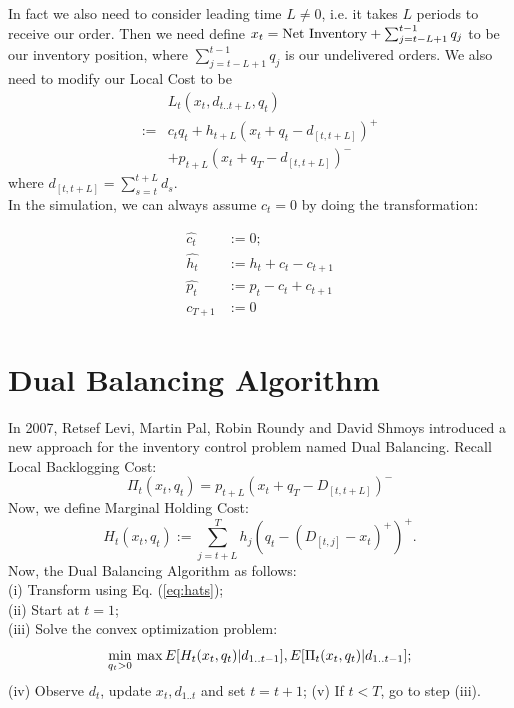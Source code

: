 \documentclass[twoside]{article}
\begin{document}
\begin{multicols}{2}
    In fact we also need to consider leading time $L \neq 0$, i.e. it takes $L$ periods to receive our order. Then we need define $x_t={\rm Net~Inventory}  + \sum_{j = t - L+1}^{t-1} q_j$ to be our inventory position, where $\sum_{j = t - L+1}^{t-1} q_j$ is our undelivered orders. We also need to modify our Local Cost to be 
        \begin{equation}\label{eq:Lneq0}
        \begin{array}{rl}
              & L_t(x_t,d_{t..t+L},q_t)\\
          := &c_tq_t + h_{t+L}(x_t + q_t - d_{[t,t+L]})^{+}\\
                                &  + p_{t+L}(x_t + q_T - d_{[t,t+L]})^{-}
        \end{array}
        \end{equation}
        where $d_{[t,t+L]}=\sum_{s=t}^{t+L} d_s$.\\
        In the simulation, we can always assume $c_t = 0$ by doing the transformation:
        
        \begin{equation}\label{eq:hats}
        \begin{array}{rl}
          \hat{c_t} &:= 0;\nonumber\\
          \hat{h_t} &:= h_t + c_t - c_{t+1}\nonumber\\
          \hat{p_t} &:= p_t - c_t + c_{t+1}\nonumber\\
          c_{T+1} &:= 0\nonumber
        \end{array}
        \end{equation}

\section{Dual Balancing Algorithm}    
    In 2007, Retsef Levi, Martin Pal, Robin Roundy and David Shmoys introduced a new approach\cite{CLAcha2} for the inventory control problem named Dual Balancing. Recall Local Backlogging Cost:
    \begin{equation}\label{eq:Bcost}
    \Pi_t(x_t,q_t) = p_{t+L}(x_t + q_T - D_{[t,t+L]})^{-}
    \end{equation}
    Now, we define Marginal Holding Cost:
    \begin{equation}\label{eq:MHcost}
    H_t(x_t,q_t) := \sum_{j = t+L}^{T} h_j (q_t - (D_{[t,j]} - x_t)^+)^+.
    \end{equation}
    Now, the Dual Balancing Algorithm as follows:\\
    (i) Transform using Eq. (\ref{eq:hats});\\
    (ii) Start at $t=1$;\\
    (iii) Solve the convex optimization problem:
    \begin{equation}\label{eq:ConvexOP}
        \min_{q_t > 0}\\ \max{E[H_t(x_t,q_t)| d_{1..t-1}], E[\Pi_t(x_t,q_t)| d_{1..t-1}]};
        \end{equation}
    (iv) Observe $d_t$, update $x_t,d_{1..t}$ and set $t=t+1$;
    (v) If $t<T$, go to step (iii).\\


\end{multicols}
\end{document}
